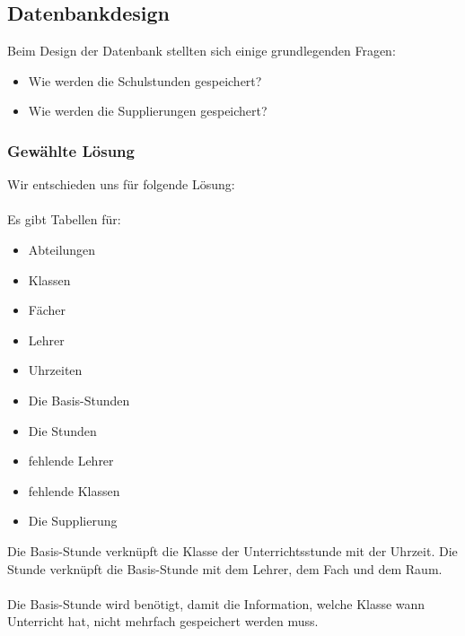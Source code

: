 \subsection{Datenbankdesign}
\label{sec:content_solution_db}
Beim Design der Datenbank stellten sich einige grundlegenden Fragen:

\begin{itemize}
	\item Wie werden die Schulstunden gespeichert?
	\item Wie werden die Supplierungen gespeichert?
\end{itemize}

\subsubsection{Gewählte Lösung}
Wir entschieden uns für folgende Lösung:\\
\\
Es gibt Tabellen für:\\
\begin{itemize}
	\item Abteilungen
	\item Klassen
	\item Fächer
	\item Lehrer
	\item Uhrzeiten
\end{itemize}
\vspace{0.03cm}
\begin{itemize}
	\item Die Basis-Stunden
	\item Die Stunden
\end{itemize}
\vspace{0.03cm}
\begin{itemize}
	\item fehlende Lehrer
	\item fehlende Klassen
\end{itemize}
\vspace{0.03cm}
\begin{itemize}
	\item Die Supplierung
\end{itemize}
Die Basis-Stunde verknüpft die Klasse der Unterrichtsstunde mit der Uhrzeit. Die Stunde verknüpft die Basis-Stunde mit dem Lehrer, dem Fach und dem Raum.\\
\\
Die Basis-Stunde wird benötigt, damit die Information, welche Klasse wann Unterricht hat, nicht mehrfach gespeichert werden muss.\\
